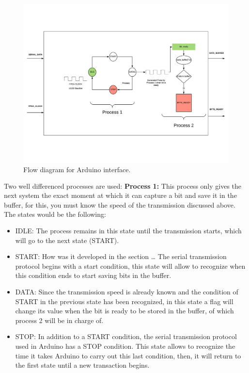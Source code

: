 \begin{center}
	\begin{figure}[H]
		\center
		\includegraphics[trim = 0mm 0mm 0mm 10mm, clip,scale=0.7, angle=90]{imagenes/Balancing_robot/arduino_interfacefluid.pdf}
		\caption{Flow diagram for Arduino interface.}
		\label{fig:arduino_interfacefluid}
	\end{figure}
\end{center}

 Two well differenced processes are used:\newline
\textbf{Process 1:} This process only gives the next system the exact moment at which it can
capture a bit and save it in the buffer, for this, you must know the speed of the transmission discussed above. The states would be the following:

\begin{itemize}
	\item IDLE: The process remains in this state until the transmission starts, which will go to the next state (START).
	\item START: How was it developed in the section … The serial transmission protocol begins with a start condition, this state will allow to recognize when this condition ends to start saving bits in the buffer. 
	\item DATA: Since the transmission speed is already known and the condition of START in the previous state has been recognized, in this state a flag will change its value
	when the bit is ready to be stored in the buffer, of which process 2 will be in charge of.
	\item STOP: In addition to a START condition, the serial transmission protocol used in Arduino has a STOP condition. This state allows to recognize the time it takes Arduino to carry out this last condition, then, it will return to the first state until a new transaction begins.
\end{itemize}

